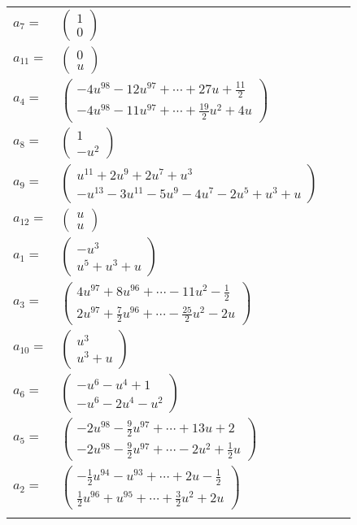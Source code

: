 \documentclass[1p]{elsarticle_modified}
\theoremstyle{definition}
\begin{document}
\begin{tabular}{m{7pt} m{180pt} m{7pt} m{180pt} }
\flushright $a_{7}=$&$\begin{pmatrix}1\\0\end{pmatrix}$ \\
\flushright $a_{11}=$&$\begin{pmatrix}0\\u\end{pmatrix}$ \\
\flushright $a_{4}=$&$\begin{pmatrix}-4 u^{98}-12 u^{97}+\cdots+27 u+\frac{11}{2}\\-4 u^{98}-11 u^{97}+\cdots+\frac{19}{2} u^2+4 u\end{pmatrix}$ \\
\flushright $a_{8}=$&$\begin{pmatrix}1\\- u^2\end{pmatrix}$ \\
\flushright $a_{9}=$&$\begin{pmatrix}u^{11}+2 u^9+2 u^7+u^3\\- u^{13}-3 u^{11}-5 u^9-4 u^7-2 u^5+u^3+u\end{pmatrix}$ \\
\flushright $a_{12}=$&$\begin{pmatrix}u\\u\end{pmatrix}$ \\
\flushright $a_{1}=$&$\begin{pmatrix}- u^3\\u^5+u^3+u\end{pmatrix}$ \\
\flushright $a_{3}=$&$\begin{pmatrix}4 u^{97}+8 u^{96}+\cdots-11 u^2-\frac{1}{2}\\2 u^{97}+\frac{7}{2} u^{96}+\cdots-\frac{25}{2} u^2-2 u\end{pmatrix}$ \\
\flushright $a_{10}=$&$\begin{pmatrix}u^3\\u^3+u\end{pmatrix}$ \\
\flushright $a_{6}=$&$\begin{pmatrix}- u^6- u^4+1\\- u^6-2 u^4- u^2\end{pmatrix}$ \\
\flushright $a_{5}=$&$\begin{pmatrix}-2 u^{98}-\frac{9}{2} u^{97}+\cdots+13 u+2\\-2 u^{98}-\frac{9}{2} u^{97}+\cdots-2 u^2+\frac{1}{2} u\end{pmatrix}$ \\
\flushright $a_{2}=$&$\begin{pmatrix}-\frac{1}{2} u^{94}- u^{93}+\cdots+2 u-\frac{1}{2}\\\frac{1}{2} u^{96}+u^{95}+\cdots+\frac{3}{2} u^2+2 u\end{pmatrix}$\\&\end{tabular}
\end{document}

